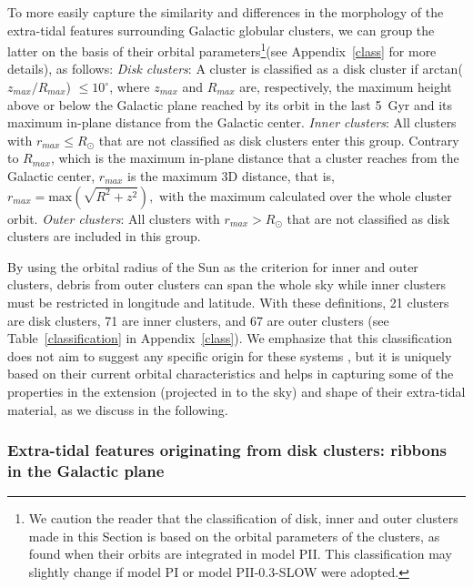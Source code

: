         To more easily capture the similarity and differences in the morphology of the extra-tidal features surrounding Galactic globular clusters, we can group the latter on the basis of their orbital parameters\footnote{We caution the reader that the classification of disk, inner and outer clusters made in this Section is based on the orbital parameters of the clusters, as found when their orbits are integrated in model PII. This classification may slightly change if model PI or model PII-0.3-SLOW were adopted.}(see Appendix~\ref{class} for more details), as follows: \emph{Disk clusters}: A cluster is classified as a disk cluster if arctan($z_{max}/R_{max}$) $\le 10^\circ$, where $z_{max}$ and $R_{max}$ are, respectively, the maximum height above or below the Galactic plane reached by its orbit in the last 5~Gyr and its maximum in-plane distance from the Galactic center. \emph{Inner clusters}: All clusters with $r_{max} \le R_{\odot}$ that are not classified as disk clusters enter this group. Contrary to $R_{max}$, which is the maximum in-plane distance that a cluster reaches from the Galactic center, $r_{max}$ is the maximum 3D distance, that is, $r_{max} = \textrm{max}(\sqrt{R^2+z^2}),$ with the maximum calculated over the whole cluster orbit. \emph{Outer clusters}: All clusters with $r_{max} > R_{\odot}$ that are not classified as disk clusters are included in this group. 

        By using the orbital radius of the Sun as the criterion for inner and outer clusters, debris from outer clusters can span the whole sky while inner clusters must be restricted in longitude and latitude. With these definitions, 21 clusters are disk clusters, 71 are inner clusters, and 67 are outer clusters (see  Table~\ref{classification} in Appendix~\ref{class}). We emphasize that this classification does not aim to suggest any specific origin for these systems \citep[e.g., whether they are in-situ or accreted, see][]{2019A&A...630L...4M}, but it is uniquely based on their current orbital characteristics and helps in capturing some of the properties in the extension (projected in to the sky) and shape of their extra-tidal material, as we discuss in the following.

        \subsubsection{Extra-tidal features originating from disk clusters: ribbons in the Galactic plane}

